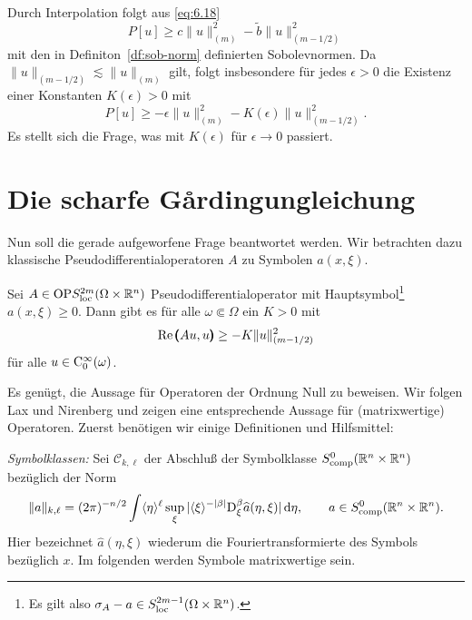 \begin{rem} 
Durch Interpolation folgt aus \eqref{eq:6.18}
\begin{equation}
P[u] \ge c \|u\|_{(m)}^2 - \tilde b \|u\|_{(m-1/2)}^2
\end{equation}
mit den in Definiton~\ref{df:sob-norm} definierten Sobolevnormen. Da $\|u\|_{(m-1/2)} \lesssim \|u\|_{(m)}$ gilt, folgt insbesondere für jedes $\epsilon>0$
die Existenz einer Konstanten $K(\epsilon)>0$ mit
\begin{equation}
P[u] \ge -\epsilon \|u\|_{(m)}^2 - K(\epsilon) \|u\|_{(m-1/2)}^2.
\end{equation}
Es stellt sich die Frage, was mit $K(\epsilon)$ für $\epsilon\to0$ passiert. 
\end{rem}

\section{Die scharfe G\r{a}rdingungleichung}

Nun soll die gerade aufgeworfene Frage beantwortet werden. Wir betrachten dazu klassische Pseudodifferentialoperatoren $A$ zu Symbolen $a(x,\xi)$.

\begin{thm}
Sei $A\in {\rm OP}S^{2m}_{\rm loc}(\Omega\times\mathbb R^n)$ Pseudodifferentialoperator mit Hauptsymbol\footnote{Es gilt also $\sigma_A-a\in S^{2m-1}_{\rm loc}(\Omega\times\mathbb R^n)$.} $a(x,\xi)\ge0$. Dann gibt es  für alle $\omega\Subset \Omega$ ein $K>0$ mit
 \begin{equation}
    \operatorname{Re} \pmb(Au,u\pmb) \ge - K \|u\|_{(m-1/2)}^2 
 \end{equation}
 für alle $u\in\mathrm C_0^\infty(\omega)$.
\end{thm}

Es genügt, die Aussage für Operatoren der Ordnung Null zu beweisen. Wir folgen Lax und Nirenberg \cite{Lax:1966} und zeigen eine entsprechende Aussage für (matrixwertige) Operatoren. Zuerst benötigen wir einige Definitionen und Hilfsmittel:

{\em Symbolklassen:} Sei $\mathcal C_{k,\ell}$ der Abschluß der Symbolklasse  $S^0_{\rm comp}(\mathbb R^n\times\mathbb R^n)$ bezüglich der Norm
\begin{equation}
   \| a\|_{k,\ell} = (2\pi)^{-n/2} \int \langle\eta\rangle^\ell \sup_\xi  |\langle\xi\rangle^{-|\beta|} \mathrm D_\xi^\beta \widehat a(\eta,\xi) | \,\mathrm d\eta,\qquad a\in S^0_{\rm comp}(\mathbb R^n\times\mathbb R^n).
\end{equation}
Hier bezeichnet $\widehat a(\eta,\xi)$ wiederum die Fouriertransformierte des Symbols bezüglich $x$. Im folgenden werden Symbole matrixwertige sein.


